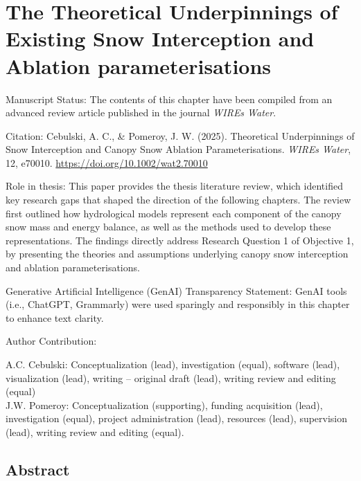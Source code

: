 \documentclass[
  letterpaper,
]{tex/uofsthesis-cs}
\begin{document}
\pagebreak


\chapter{The Theoretical Underpinnings of Existing Snow Interception and
Ablation parameterisations}\label{sec-chapter-2}

Manuscript Status: The contents of this chapter have been compiled from
an advanced review article published in the journal \emph{WIREs Water}.

Citation: Cebulski, A. C., \& Pomeroy, J. W. (2025). Theoretical
Underpinnings of Snow Interception and Canopy Snow Ablation
Parameterisations. \emph{WIREs Water}, 12, e70010.
\url{https://doi.org/10.1002/wat2.70010}

Role in thesis: This paper provides the thesis literature review, which
identified key research gaps that shaped the direction of the following
chapters. The review first outlined how hydrological models represent
each component of the canopy snow mass and energy balance, as well as
the methods used to develop these representations. The findings directly
address Research Question 1 of Objective 1, by presenting the theories
and assumptions underlying canopy snow interception and ablation
parameterisations.

Generative Artificial Intelligence (GenAI) Transparency Statement: GenAI
tools (i.e., ChatGPT, Grammarly) were used sparingly and responsibly in
this chapter to enhance text clarity.

Author Contribution:

A.C. Cebulski: Conceptualization (lead), investigation (equal), software
(lead), visualization (lead), writing -- original draft (lead), writing
review and editing (equal)\\
J.W. Pomeroy: Conceptualization (supporting), funding acquisition
(lead), investigation (equal), project administration (lead), resources
(lead), supervision (lead), writing review and editing (equal).

\section{Abstract}\label{abstract}
\end{document}
